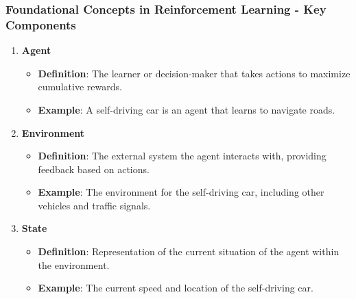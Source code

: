 \documentclass[aspectratio=169]{beamer}
\begin{document}
\begin{frame}[fragile]
    \frametitle{Foundational Concepts in Reinforcement Learning - Key Components}
    \begin{enumerate}
        \item \textbf{Agent}
        \begin{itemize}
            \item \textbf{Definition}: The learner or decision-maker that takes actions to maximize cumulative rewards.
            \item \textbf{Example}: A self-driving car is an agent that learns to navigate roads.
        \end{itemize}
        
        \item \textbf{Environment}
        \begin{itemize}
            \item \textbf{Definition}: The external system the agent interacts with, providing feedback based on actions.
            \item \textbf{Example}: The environment for the self-driving car, including other vehicles and traffic signals.
        \end{itemize}
        
        \item \textbf{State}
        \begin{itemize}
            \item \textbf{Definition}: Representation of the current situation of the agent within the environment.
            \item \textbf{Example}: The current speed and location of the self-driving car.
        \end{itemize}
    \end{enumerate}
\end{frame}
\end{document}

